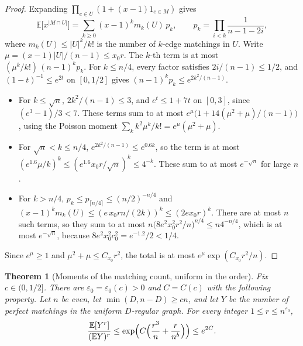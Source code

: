 \documentclass[11pt]{article}
\newtheorem{theorem}{Theorem}
\newcommand{\EE}{\mathbb{E}}
\begin{document}
\begin{proof}
Expanding \(\prod_{e\in U}(1+(x-1)1_{e\in M})\) gives
\[
\EE\bigl[x^{|M\cap U|}\bigr]=\sum_{k\ge0}(x-1)^k m_k(U)\,p_k,
\qquad
p_k=\prod_{i<k}\frac1{n-1-2i},
\]
where \(m_k(U)\le|U|^k/k!\) is the number of \(k\)-edge matchings in \(U\).
Write \(\mu=(x-1)|U|/(n-1)\le x_0r\).
The \(k\)-th term is at most \((\mu^k/k!)\,(n-1)^kp_k\).
For \(k\le n/4\), every factor satisfies \(2i/(n-1)\le1/2\), and
\((1-t)^{-1}\le e^{2t}\) on \([0,1/2]\) gives
\((n-1)^kp_k\le e^{2k^2/(n-1)}\).
\begin{itemize}
\item For \(k\le\sqrt n\), \(2k^2/(n-1)\le3\), and \(e^t\le1+7t\) on \([0,3]\),
since \((e^3-1)/3<7\). These terms sum to at most
\(e^{\mu}\bigl(1+14(\mu^2+\mu)/(n-1)\bigr)\), using the Poisson moment
\(\sum_k k^2\mu^k/k!=e^\mu(\mu^2+\mu)\).
\item For \(\sqrt n<k\le n/4\), \(e^{2k^2/(n-1)}\le e^{0.6k}\), so the term is
at most \((e^{1.6}\mu/k)^k\le(e^{1.6}x_0r/\sqrt n)^k\le4^{-k}\). These sum to at
most \(e^{-\sqrt n}\) for large \(n\).
\item For \(k>n/4\), \(p_k\le p_{\lceil n/4\rceil}\le(n/2)^{-n/4}\) and
\((x-1)^km_k(U)\le(e\,x_0rn/(2k))^k\le(2ex_0r)^k\). There are at most \(n\)
such terms, so they sum to at most
\(n\bigl(8e^2x_0^2r^2/n\bigr)^{n/4}\le n4^{-n/4}\), which is at most
\(e^{-\sqrt n}\), because \(8e^2x_0^2c_0^2=e^{-1.2}/2<1/4\).
\end{itemize}
Since \(e^\mu\ge1\) and \(\mu^2+\mu\le C_{x_0}r^2\), the total is at most
\(e^\mu\exp(C_{x_0}r^2/n)\).
\end{proof}

\begin{theorem}[Moments of the matching count, uniform in the order]
\label{thm:uniform-moments}
Fix \(c\in(0,1/2]\).
There are \(\varepsilon_0=\varepsilon_0(c)>0\) and \(C=C(c)\) with the
following property.
Let \(n\) be even, let \(\min(D,n-D)\ge cn\), and let \(Y\) be the number of
perfect matchings in the uniform \(D\)-regular graph.
For every integer \(1\le r\le n^{\varepsilon_0}\),
\[
\frac{\EE[Y^r]}{(\EE Y)^r}\le\exp\Bigl(C\Bigl(\frac{r^3}{n}+\frac{r}{n^{b}}\Bigr)\Bigr)\le e^{2C}.
\]
\end{theorem}
\end{document}
